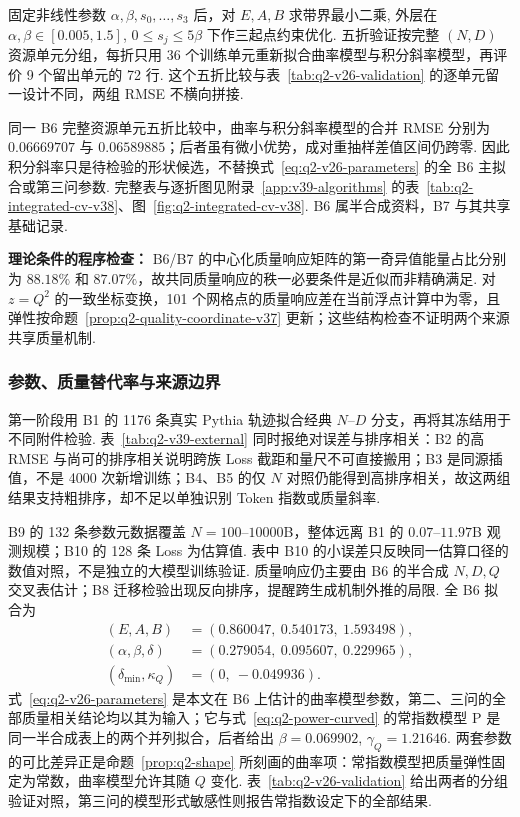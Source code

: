 固定非线性参数 $\alpha,\beta,s_0,\ldots,s_3$ 后，对 $E,A,B$ 求带界最小二乘, 外层在 $\alpha,\beta\in[0.005,1.5]$, $0\le s_j\le5\beta$ 下作三起点约束优化. 五折验证按完整 $(N,D)$ 资源单元分组，每折只用 36 个训练单元重新拟合曲率模型与积分斜率模型，再评价 9 个留出单元的 72 行. 这个五折比较与表~\ref{tab:q2-v26-validation} 的逐单元留一设计不同，两组 RMSE 不横向拼接. 

同一 B6 完整资源单元五折比较中，曲率与积分斜率模型的合并 RMSE 分别为 $0.06669707$ 与 $0.06589885$；后者虽有微小优势，成对重抽样差值区间仍跨零. 因此积分斜率只是待检验的形状候选，不替换式~\eqref{eq:q2-v26-parameters} 的全 B6 主拟合或第三问参数. 完整表与逐折图见附录~\ref{app:v39-algorithms} 的表~\ref{tab:q2-integrated-cv-v38}、图~\ref{fig:q2-integrated-cv-v38}. B6 属半合成资料，B7 与其共享基础记录. 


\textbf{理论条件的程序检查：}
B6/B7 的中心化质量响应矩阵的第一奇异值能量占比分别为 $88.18\%$ 和 $87.07\%$，故共同质量响应的秩一必要条件是近似而非精确满足. 对 $z=Q^2$ 的一致坐标变换，101 个网格点的质量响应差在当前浮点计算中为零，且弹性按命题~\ref{prop:q2-quality-coordinate-v37} 更新；这些结构检查不证明两个来源共享质量机制. 

\subsubsection{参数、质量替代率与来源边界}
第一阶段用 B1 的 1176 条真实 Pythia 轨迹拟合经典 $N$--$D$ 分支，再将其冻结用于不同附件检验. 表~\ref{tab:q2-v39-external} 同时报绝对误差与排序相关：B2 的高 RMSE 与尚可的排序相关说明跨族 Loss 截距和量尺不可直接搬用；B3 是同源插值，不是 4000 次新增训练；B4、B5 的仅 $N$ 对照仍能得到高排序相关，故这两组结果支持粗排序，却不足以单独识别 Token 指数或质量斜率. 

B9 的 132 条参数元数据覆盖 $N=100$--$10000$B，整体远离 B1 的 $0.07$--$11.97$B 观测规模；B10 的 128 条 Loss 为估算值. 表中 B10 的小误差只反映同一估算口径的数值对照，不是独立的大模型训练验证. 质量响应仍主要由 B6 的半合成 $N,D,Q$ 交叉表估计；B8 迁移检验出现反向排序，提醒跨生成机制外推的局限. 
全 B6 拟合为
\begin{align}\label{eq:q2-v26-parameters}
(E,A,B)&=(0.860047,\ 0.540173,\ 1.593498),\\
(\alpha,\beta,\delta)&=(0.279054,\ 0.095607,\ 0.229965),\\
(\delta_{\min},\kappa_Q)&=(0,\ -0.049936).
\end{align}
式~\eqref{eq:q2-v26-parameters} 是本文在 B6 上估计的曲率模型参数，第二、三问的全部质量相关结论均以其为输入；它与式~\eqref{eq:q2-power-curved} 的常指数模型 $\mathrm P$ 是同一半合成表上的两个并列拟合，后者给出 $\beta=0.069902$, $\gamma_Q=1.21646$. 两套参数的可比差异正是命题~\ref{prop:q2-shape} 所刻画的曲率项：常指数模型把质量弹性固定为常数，曲率模型允许其随 $Q$ 变化. 表~\ref{tab:q2-v26-validation} 给出两者的分组验证对照，第三问的模型形式敏感性则报告常指数设定下的全部结果.

